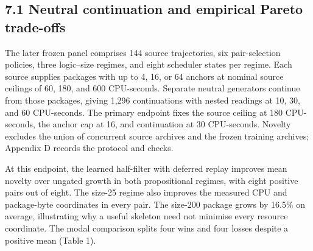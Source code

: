 \documentclass[pdflatex,sn-basic,Numbered]{sn-jnl}
\begin{document}
\subsection*{7.1 Neutral continuation and empirical Pareto trade-offs}\label{neutral-continuation-and-empirical-pareto-trade-offs}

The later frozen panel comprises 144 source trajectories, six pair-selection policies, three logic--size regimes, and eight scheduler states per regime. Each source supplies packages with up to 4, 16, or 64 anchors at nominal source ceilings of 60, 180, and 600 CPU-seconds. Separate neutral generators continue from those packages, giving 1,296 continuations with nested readings at 10, 30, and 60 CPU-seconds. The primary endpoint fixes the source ceiling at 180 CPU-seconds, the anchor cap at 16, and continuation at 30 CPU-seconds. Novelty excludes the union of concurrent source archives and the frozen training archives; Appendix D records the protocol and checks.

At this endpoint, the learned half-filter with deferred replay improves mean novelty over ungated growth in both propositional regimes, with eight positive pairs out of eight. The size-25 regime also improves the measured CPU and package-byte coordinates in every pair. The size-200 package grows by 16.5\% on average, illustrating why a useful skeleton need not minimise every resource coordinate. The modal comparison splits four wins and four losses despite a positive mean (Table 1).

\begingroup
\small
\setlength{\tabcolsep}{3pt}
\renewcommand{\arraystretch}{1.13}
\end{document}
